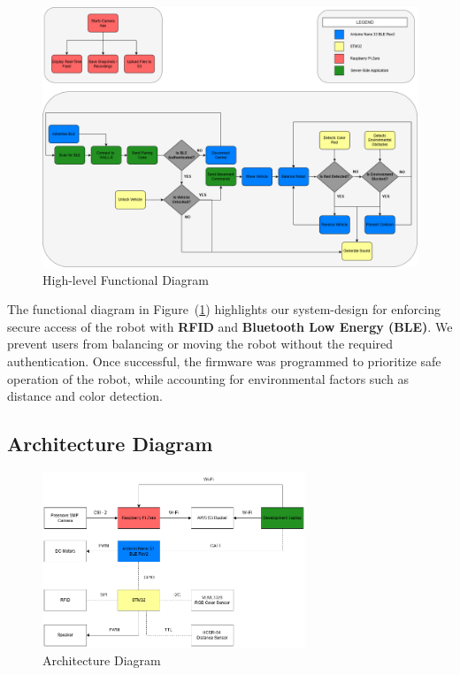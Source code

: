 \documentclass{article}
\begin{document}
\begin{figure}[H]
    \centering
    \includegraphics[width=1\textwidth]{Figures/Functional_Diagram.png}
    \caption{High-level Functional Diagram}
    \label{fig:functional_diagram}
\end{figure}

\begin{minipage}{\linewidth}
    The functional diagram in Figure~(\ref{fig:functional_diagram}) highlights our system-design for enforcing secure access of the robot with
    \textbf{RFID} and \textbf{Bluetooth Low Energy (BLE)}. We prevent users from balancing or moving the robot without the required authentication. Once successful,
    the firmware was programmed to prioritize safe operation of the robot, while accounting for environmental factors such as distance and color detection. \\
\end{minipage}

\subsection{Architecture Diagram}

\begin{figure}[H]
    \centering
    \includegraphics[width=0.7\textwidth]{Figures/Architecture_Diagram.png}
    \caption{Architecture Diagram}
    \label{fig:architecture_diagram}
\end{figure}
\end{document}

